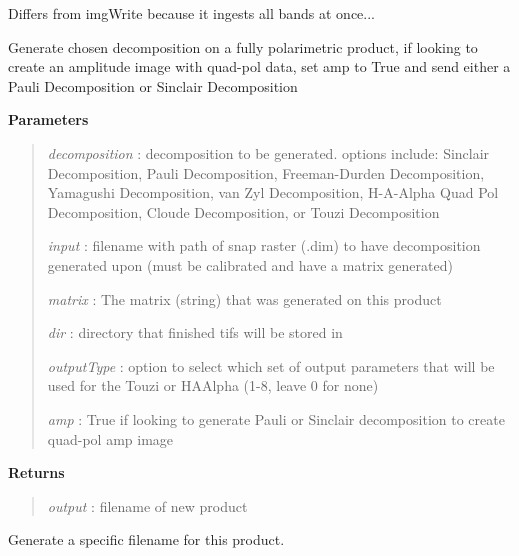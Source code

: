 \documentclass[letterpaper,10pt,openany,oneside]{sphinxmanual}
\begin{document}
\begin{fulllineitems}
\begin{fulllineitems}
Differs from imgWrite because it ingests all bands at once...

\end{fulllineitems}


\begin{fulllineitems}
\label{code:Image.Image.decomposition_generation}
Generate chosen decomposition on a fully polarimetric product, if looking to create an amplitude image with quad-pol data, set amp to True
and send either a Pauli Decomposition or Sinclair Decomposition

\textbf{Parameters}
\begin{quote}

\emph{decomposition} : decomposition to be generated. options include: Sinclair Decomposition, Pauli Decomposition, Freeman-Durden Decomposition, Yamagushi Decomposition, van Zyl Decomposition, H-A-Alpha Quad Pol Decomposition, Cloude Decomposition, or Touzi Decomposition

\emph{input} : filename with path of snap raster (.dim) to have decomposition generated upon (must be calibrated and have a matrix generated)

\emph{matrix} : The matrix (string) that was generated on this product

\emph{dir} : directory that finished tifs will be stored in

\emph{outputType} : option to select which set of output parameters that will be used for the Touzi or HAAlpha (1-8, leave 0 for none)

\emph{amp} : True if looking to generate Pauli or Sinclair decomposition to create quad-pol amp image
\end{quote}

\textbf{Returns}
\begin{quote}

\emph{output} : filename of new product
\end{quote}

\end{fulllineitems}


\begin{fulllineitems}
\label{code:Image.Image.fnameGenerate}
Generate a specific filename for this product.


\end{fulllineitems}
\end{fulllineitems}
\end{document}
